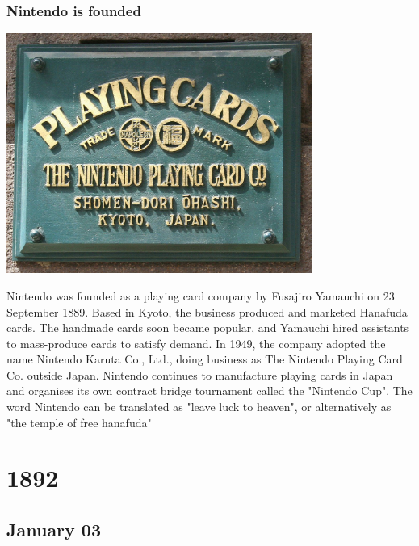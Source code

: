 \documentclass[11pt]{report}
\begin{document}
\subsection{Nintendo is founded}
\vspace{2mm}\begin{center}\includegraphics[width=10cm]{./img/nintendoFounded.jpg}\end{center}
Nintendo was founded as a playing card company by Fusajiro Yamauchi on 23 September 1889. Based in Kyoto, the business produced and marketed Hanafuda cards. The handmade cards soon became popular, and Yamauchi hired assistants to mass-produce cards to satisfy demand. In 1949, the company adopted the name Nintendo Karuta Co., Ltd., doing business as The Nintendo Playing Card Co. outside Japan. Nintendo continues to manufacture playing cards in Japan and organises its own contract bridge tournament called the "Nintendo Cup". The word Nintendo can be translated as "leave luck to heaven", or alternatively as "the temple of free hanafuda"

\chapter{1892}
\section{January 03}
\end{document}
